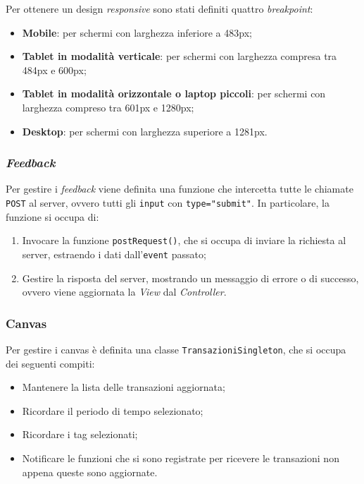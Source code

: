 Per ottenere un design \textit{responsive} sono stati definiti quattro 
\textit{breakpoint}:
\begin{itemize}
	\item \textbf{Mobile}: per schermi con larghezza inferiore a 483px;

	\item \textbf{Tablet in modalità verticale}: per schermi con larghezza 
		compresa tra 484px e 600px;

	\item \textbf{Tablet in modalità orizzontale o laptop piccoli}: per schermi 
		con larghezza compreso tra 601px e 1280px;

	\item \textbf{Desktop}: per schermi con larghezza superiore a 1281px.
\end{itemize}

\subsubsection{\textit{Feedback}}

Per gestire i \textit{feedback} viene definita una funzione che intercetta tutte
le chiamate \texttt{POST} al server, ovvero tutti gli \texttt{input} con 
\texttt{type="submit"}. In particolare, la funzione si occupa di:
\begin{enumerate}
	\item Invocare la funzione \texttt{postRequest()}, che si occupa di inviare
		la richiesta al server, estraendo i dati dall'\texttt{event} passato;

	\item Gestire la risposta del server, mostrando un messaggio di errore o di
		successo, ovvero viene aggiornata la \textit{View} dal 
		\textit{Controller}.
\end{enumerate}

\subsubsection{Canvas}

Per gestire i canvas è definita una classe \texttt{TransazioniSingleton}, che si
occupa dei seguenti compiti:
\begin{itemize}
	\item Mantenere la lista delle transazioni aggiornata;

	\item Ricordare il periodo di tempo selezionato;

	\item Ricordare i tag selezionati;

	\item Notificare le funzioni che si sono registrate per ricevere le 
		transazioni non appena queste sono aggiornate.
\end{itemize}

